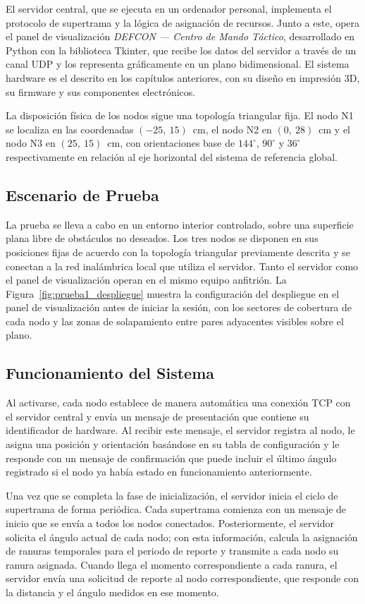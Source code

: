 El servidor central, que se ejecuta en un ordenador personal, implementa el protocolo de supertrama y la lógica de asignación de recursos. Junto a este, opera el panel de visualización \textit{DEFCON — Centro de Mando Táctico}, desarrollado en Python con la biblioteca Tkinter, que recibe los datos del servidor a través de un canal UDP y los representa gráficamente en un plano bidimensional. El sistema hardware es el descrito en los capítulos anteriores, con su diseño en impresión 3D, su firmware y sus componentes electrónicos.

La disposición física de los nodos sigue una topología triangular fija. El nodo N1 se localiza en las coordenadas $(-25,~15)$~cm, el nodo N2 en $(0,~28)$~cm y el nodo N3 en $(25,~15)$~cm, con orientaciones base de $144^\circ$, $90^\circ$ y $36^\circ$ respectivamente en relación al eje horizontal del sistema de referencia global.

\subsection{Escenario de Prueba}

La prueba se lleva a cabo en un entorno interior controlado, sobre una superficie plana libre de obstáculos no deseados. Los tres nodos se disponen en sus posiciones fijas de acuerdo con la topología triangular previamente descrita y se conectan a la red inalámbrica local que utiliza el servidor. Tanto el servidor como el panel de visualización operan en el mismo equipo anfitrión. La Figura~\ref{fig:prueba1_despliegue} muestra la configuración del despliegue en el panel de visualización antes de iniciar la sesión, con los sectores de cobertura de cada nodo y las zonas de solapamiento entre pares adyacentes visibles sobre el plano.

\subsection{Funcionamiento del Sistema}

Al activarse, cada nodo establece de manera automática una conexión TCP con el servidor central y envía un mensaje de presentación que contiene su identificador de hardware. Al recibir este mensaje, el servidor registra al nodo, le asigna una posición y orientación basándose en su tabla de configuración y le responde con un mensaje de confirmación que puede incluir el último ángulo registrado si el nodo ya había estado en funcionamiento anteriormente.

Una vez que se completa la fase de inicialización, el servidor inicia el ciclo de supertrama de forma periódica. Cada supertrama comienza con un mensaje de inicio que se envía a todos los nodos conectados. Posteriormente, el servidor solicita el ángulo actual de cada nodo; con esta información, calcula la asignación de ranuras temporales para el periodo de reporte y transmite a cada nodo su ranura asignada. Cuando llega el momento correspondiente a cada ranura, el servidor envía una solicitud de reporte al nodo correspondiente, que responde con la distancia y el ángulo medidos en ese momento.

